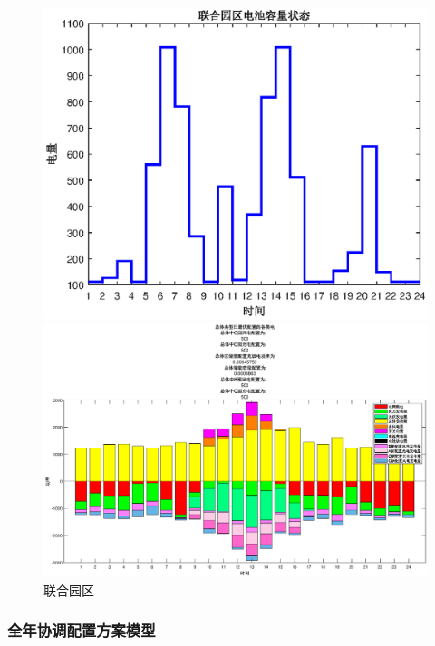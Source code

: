 \documentclass{cumcmthesis}
\begin{document}
 \begin{figure}[!h]  
\centering 
\begin{minipage}{.5\textwidth}  
  \centering  
  \includegraphics[width=.9\linewidth]{figures/31联合园区电池.eps}  
\end{minipage}%
\begin{minipage}{.5\textwidth}  
  \centering  
  \includegraphics[width=.9\linewidth]{figures/Q31_Usort.eps}  
\end{minipage}  
\caption{联合园区}  
\end{figure} 
\newpage
  

  \subsubsection{全年协调配置方案模型}\label{ll}
  
\end{document}
